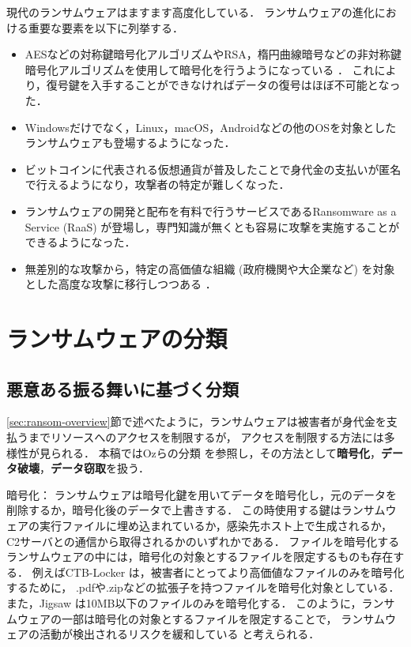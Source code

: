 現代のランサムウェアはますます高度化している．
ランサムウェアの進化における重要な要素を以下に列挙する．
\begin{itemize}
  \item AESなどの対称鍵暗号化アルゴリズムやRSA，楕円曲線暗号などの非対称鍵暗号化アルゴリズムを使用して暗号化を行うようになっている \cite{Evolution-Ransomware}．
        これにより，復号鍵を入手することができなければデータの復号はほぼ不可能となった．

  \item Windowsだけでなく，Linux，macOS，Androidなどの他のOSを対象としたランサムウェアも登場するようになった．

  \item ビットコインに代表される仮想通貨が普及したことで身代金の支払いが匿名で行えるようになり，攻撃者の特定が難しくなった．

  \item ランサムウェアの開発と配布を有料で行うサービスであるRansomware as a Service (RaaS) が登場し，専門知識が無くとも容易に攻撃を実施することができるようになった．

  \item 無差別的な攻撃から，特定の高価値な組織 (政府機関や大企業など) を対象とした高度な攻撃に移行しつつある \cite{early-detection}．
\end{itemize}

\section{ランサムウェアの分類}
\subsection{悪意ある振る舞いに基づく分類}
\ref{sec:ransom-overview}節で述べたように，ランサムウェアは被害者が身代金を支払うまでリソースへのアクセスを制限するが，
アクセスを制限する方法には多様性が見られる．
本稿ではOzらの分類 \cite{Evolution-Ransomware} を参照し，その方法として\textbf{暗号化}，\textbf{データ破壊}，\textbf{データ窃取}を扱う．

暗号化：
ランサムウェアは暗号化鍵を用いてデータを暗号化し，元のデータを削除するか，暗号化後のデータで上書きする．
この時使用する鍵はランサムウェアの実行ファイルに埋め込まれているか，感染先ホスト上で生成されるか，C2サーバとの通信から取得されるかのいずれかである．
ファイルを暗号化するランサムウェアの中には，暗号化の対象とするファイルを限定するものも存在する．
例えばCTB-Locker \cite{ctb-locker} は，被害者にとってより高価値なファイルのみを暗号化するために，
.pdfや.zipなどの拡張子を持つファイルを暗号化対象としている．
また，Jigsaw \cite{byrne2017jigsaw} は10MB以下のファイルのみを暗号化する．
このように，ランサムウェアの一部は暗号化の対象とするファイルを限定することで，
ランサムウェアの活動が検出されるリスクを緩和している \cite{huang2017flashguard}と考えられる．

